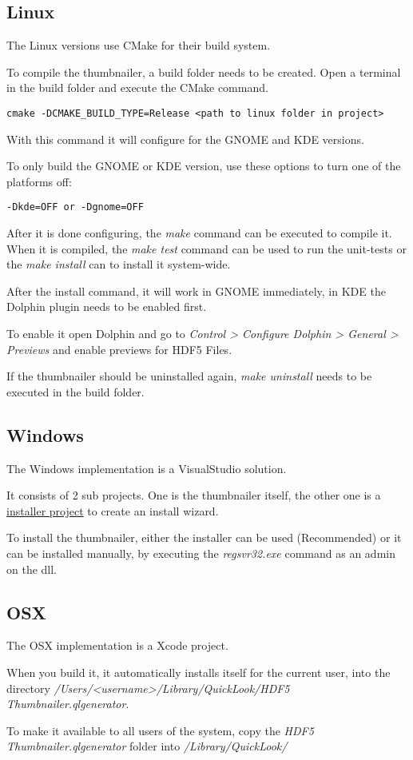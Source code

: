 \subsection{Linux}

The Linux versions use CMake for their build system.

To compile the thumbnailer, a build folder needs to be created.
Open a terminal in the build folder and execute the CMake command.

\begin{lstlisting}
cmake -DCMAKE_BUILD_TYPE=Release <path to linux folder in project>
\end{lstlisting}

With this command it will configure for the GNOME and KDE versions.

To only build the GNOME or KDE version, use these options to turn one of the platforms off:
\begin{lstlisting}
-Dkde=OFF or -Dgnome=OFF
\end{lstlisting}

After it is done configuring, the \emph{make} command can be executed to compile it.
When it is compiled, the \emph{make test} command can be used to run the unit-tests or
the \emph{make install} can to install it system-wide.

After the install command, it will work in GNOME immediately, in KDE the Dolphin plugin needs to be enabled first.

To enable it open Dolphin and go to \emph{Control > Configure Dolphin > General > Previews}
and enable previews for HDF5 Files.

If the thumbnailer should be uninstalled again, \emph{make uninstall} needs to be executed in the build folder.

\subsection{Windows}

The Windows implementation is a VisualStudio solution.

It consists of 2 sub projects. One is the thumbnailer itself,
the other one is a \href{https://marketplace.visualstudio.com/items?itemName=VisualStudioProductTeam.MicrosoftVisualStudio2017InstallerProjects}{installer project}
to create an install wizard.

To install the thumbnailer, either the installer can be used (Recommended) or it can be installed manually,
by executing the \emph{regsvr32.exe} command as an admin on the dll.

\subsection{OSX}

The OSX implementation is a Xcode project.

When you build it, it automatically installs itself for the current user, into the directory
\emph{/Users/<username>/Library/QuickLook/HDF5 Thumbnailer.qlgenerator}.

To make it available to all users of the system, copy the \emph{HDF5 Thumbnailer.qlgenerator} folder into
\emph{/Library/QuickLook/}